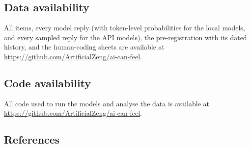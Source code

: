 \documentclass[
  11pt,
]{article}
\begin{document}
\hypertarget{data-availability}{%
\subsection{Data availability}\label{data-availability}}

All items, every model reply (with token-level probabilities for the
local models, and every sampled reply for the API models), the
pre-registration with its dated history, and the human-coding sheets are
available at \url{https://github.com/ArtificialZeng/ai-can-feel}.

\hypertarget{code-availability}{%
\subsection{Code availability}\label{code-availability}}

All code used to run the models and analyse the data is available at
\url{https://github.com/ArtificialZeng/ai-can-feel}.

\hypertarget{references}{%
\subsection{References}\label{references}}
\end{document}
